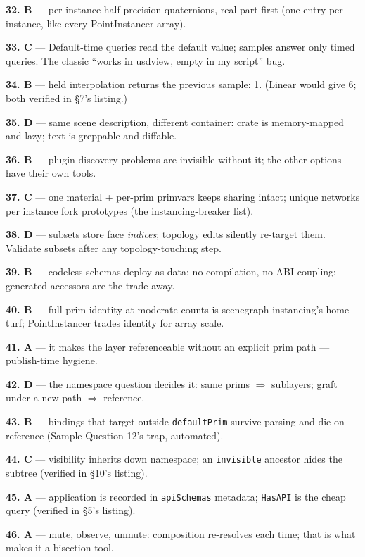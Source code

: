 \noindent\textbf{32. B} --- per-instance half-precision quaternions, real
part first (one entry per instance, like every PointInstancer array).

\noindent\textbf{33. C} --- Default-time queries read the default value;
samples answer only timed queries. The classic ``works in usdview, empty in
my script'' bug.

\noindent\textbf{34. B} --- held interpolation returns the previous sample:
1. (Linear would give 6; both verified in \S7's listing.)

\noindent\textbf{35. D} --- same scene description, different container:
crate is memory-mapped and lazy; text is greppable and diffable.

\noindent\textbf{36. B} --- plugin discovery problems are invisible without
it; the other options have their own tools.

\noindent\textbf{37. C} --- one material + per-prim primvars keeps sharing
intact; unique networks per instance fork prototypes (the instancing-breaker
list).

\noindent\textbf{38. D} --- subsets store face \emph{indices}; topology
edits silently re-target them. Validate subsets after any
topology-touching step.

\noindent\textbf{39. B} --- codeless schemas deploy as data: no
compilation, no ABI coupling; generated accessors are the trade-away.

\noindent\textbf{40. B} --- full prim identity at moderate counts is
scenegraph instancing's home turf; PointInstancer trades identity for
array scale.

\noindent\textbf{41. A} --- it makes the layer referenceable without an
explicit prim path --- publish-time hygiene.

\noindent\textbf{42. D} --- the namespace question decides it: same prims
$\Rightarrow$ sublayers; graft under a new path $\Rightarrow$ reference.

\noindent\textbf{43. B} --- bindings that target outside
\texttt{defaultPrim} survive parsing and die on reference (Sample
Question 12's trap, automated).

\noindent\textbf{44. C} --- visibility inherits down namespace; an
\texttt{invisible} ancestor hides the subtree (verified in \S10's listing).

\noindent\textbf{45. A} --- application is recorded in \texttt{apiSchemas}
metadata; \texttt{HasAPI} is the cheap query (verified in \S5's listing).

\noindent\textbf{46. A} --- mute, observe, unmute: composition re-resolves
each time; that is what makes it a bisection tool.

